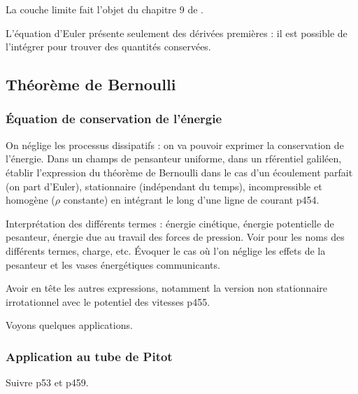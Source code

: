 \begin{remarque}
La couche limite fait l'objet du chapitre 9 de \cite{Guyon2001}.
\end{remarque}

\begin{transition}
L'équation d'Euler présente seulement des dérivées premières : il est possible de l'intégrer pour trouver des quantités conservées.
\end{transition}

\subsection{Théorème de Bernoulli}

\subsubsection{Équation de conservation de l'énergie}

On néglige les processus dissipatifs : on va pouvoir exprimer la conservation de l'énergie.
Dans un champs de pensanteur uniforme, dans un rférentiel galiléen, établir l'expression du théorème de Bernoulli dans le cas d'un écoulement parfait (on part d'Euler), stationnaire (indépendant du temps), incompressible et homogène ($\rho$ constante) en intégrant le long d'une ligne de courant \cite{Olivier2000} p454.

Interprétation des différents termes : énergie cinétique, énergie potentielle de pesanteur, énergie due au travail des forces de pression.
Voir \cite{Rabaud2019} pour les noms des différents termes, charge, etc.
Évoquer le cas où l'on néglige les effets de la pesanteur et les \og vases énergétiques communicants\fg{}.

\begin{remarque}
Avoir en tête les autres expressions, notamment la version non stationnaire irrotationnel avec le potentiel des vitesses \cite{Olivier2000} p455.
\end{remarque}

\begin{transition}
Voyons quelques applications.
\end{transition}

\subsubsection{Application au tube de Pitot}

Suivre \cite{Rabaud2019} p53 et \cite{Olivier2000} p459.

